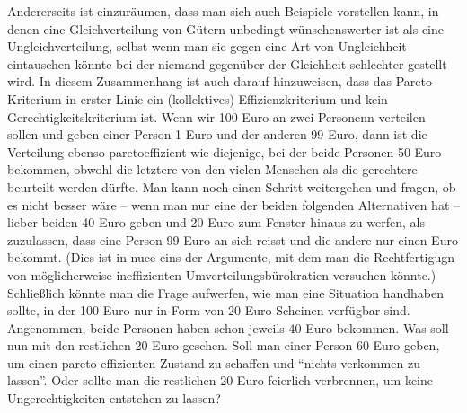 Andererseits ist einzuräumen, dass man sich auch Beispiele vorstellen kann, in
denen eine Gleichverteilung von Gütern unbedingt wünschenswerter ist als eine
Ungleichverteilung, selbst wenn man sie gegen eine Art von Ungleichheit
eintauschen könnte bei der niemand gegenüber der Gleichheit schlechter gestellt
wird. In diesem Zusammenhang ist auch darauf hinzuweisen, dass das
Pareto-Kriterium in erster Linie ein (kollektives) Effizienzkriterium und kein
Gerechtigkeitskriterium ist. Wenn wir 100 Euro an zwei Personenn verteilen
sollen und geben einer Person 1 Euro und der anderen 99 Euro, dann ist die
Verteilung ebenso paretoeffizient wie diejenige, bei der beide Personen 50 Euro
bekommen, obwohl die letztere von den vielen Menschen als die gerechtere beurteilt werden
dürfte. Man kann noch einen Schritt weitergehen und fragen, ob es nicht besser
wäre -- wenn man nur eine der beiden folgenden Alternativen hat -- lieber beiden
40 Euro geben und 20 Euro zum Fenster hinaus zu werfen, als zuzulassen, dass
eine Person 99 Euro an sich reisst und die andere nur einen Euro
bekommt. (Dies ist in nuce eins der Argumente, mit dem man die
Rechtfertigugn von möglicherweise ineffizienten Umverteilungsbürokratien
versuchen könnte.) Schließlich könnte man die Frage aufwerfen, wie man eine
Situation handhaben sollte, in der 100
Euro nur in Form von 20 Euro-Scheinen verfügbar sind. Angenommen, beide Personen
haben schon jeweils 40 Euro bekommen. Was soll nun mit den restlichen 20 Euro geschen.
Soll man einer Person 60 Euro geben, um einen pareto-effizienten Zustand zu
schaffen und "`nichts verkommen zu lassen"'. Oder sollte man die restlichen 20
Euro feierlich verbrennen, um keine Ungerechtigkeiten entstehen zu
lassen?


